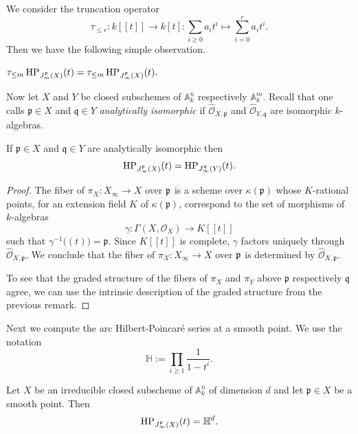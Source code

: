 We consider the truncation operator
\[  \tau_{\leq r} : k[[t]] \to k[t] : \sum_{i\geq 0} a_it^i \mapsto \sum_{i=0}^r a_it^i.\] 
Then we have the following simple observation.

\begin{Prop}\label{prop:approximate_by_jet_spaces}
$\tau_{\leq m} \operatorname{HP}_{J_{m}^{\mathfrak{p}}(X)}(t) = \tau_{\leq m} \operatorname{HP}_{J_{\infty}^{\mathfrak{p}}(X)}(t).$
\end{Prop}

Now let $X$ and $Y$ be closed subschemes of $\mathbb{A}^n_k$ respectively $\mathbb{A}^m_k$. Recall that one calls $\mathfrak{p}\in X$ and $\mathfrak{q}\in Y$ \textit{analytically isomorphic} if $\widehat{\mathcal{O}}_{X,\mathfrak{p}}$ and $\widehat{\mathcal{O}}_{Y,\mathfrak{q}}$ are isomorphic $k$-algebras.

\begin{Prop}\label{prop:series_is_analytic_invariant}
If $\mathfrak{p}\in X$ and $\mathfrak{q}\in Y$ are analytically isomorphic then 
\[ \operatorname{HP}_{J_{\infty}^{\mathfrak{p}}(X)}(t) =  \operatorname{HP}_{J_{\infty}^{\mathfrak{q}}(Y)}(t).\]
\end{Prop}

\begin{proof}
The fiber of $\pi_X : X_{\infty} \to X$ over $\mathfrak{p}$ is a scheme over $\kappa(\mathfrak{p})$ whose $K$-rational points, for an extension field $K$ of $\kappa(\mathfrak{p})$, correspond to the set of morphisms of $k$-algebras
\[ \gamma: \Gamma(X,\mathcal{O}_X) \to K[[t]]          \]
such that $\gamma^{-1}\bigl((t)\bigr) = \mathfrak{p}$. Since $K[[t]]$ is complete, $\gamma$ factors uniquely through $\widehat{\mathcal{O}}_{X,\mathfrak{p}}$. We conclude that the fiber of $\pi_X : X_{\infty} \to X$ over $\mathfrak{p}$ is determined by $\widehat{\mathcal{O}}_{X,\mathfrak{p}}$. 

To see that the graded structure of the fibers of $\pi_X$ and $\pi_Y$ above $\mathfrak{p}$ respectively $\mathfrak{q}$ agree, we can use the intrinsic description of the graded structure from the previous remark.
\end{proof}

Next we compute the arc Hilbert-Poincar\'{e} series at a smooth point. We use the notation
\[  \mathbb{H} := \prod_{i\geq 1} \frac{1}{1-t^i}.    \]

\begin{Prop}\label{prop:smooth_case}
Let $X$ be an irreducible closed subscheme of $\mathbb{A}^n_k$ of dimension $d$ and let $\mathfrak{p}\in X$ be a smooth point. Then
\[  \operatorname{HP}_{J_{\infty}^{\mathfrak{p}}(X)}(t) = \mathbb{H}^{d}. \]
\end{Prop}

